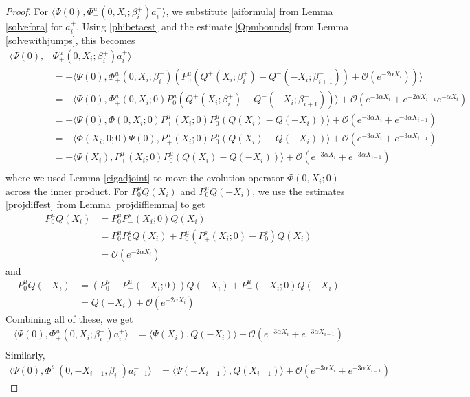 \documentclass[thesis.tex]{subfiles}
\begin{document}
\begin{lemma}
\begin{proof}
For $\langle \Psi(0), \Phi^u_+(0, X_i; \beta_i^+) a_i^+ \rangle$, we substitute \eqref{aiformula} from Lemma \ref{solvefora} for $a_i^+$. Using \eqref{phibetaest} and the estimate \eqref{Qpmbounds} from Lemma \ref{solvewithjumps}, this becomes
\begin{align*}
\langle \Psi(0), &\Phi^u_+(0, X_i; \beta_i^+) a_i^+ \rangle \\
&= -\langle \Psi(0), \Phi^u_+(0, X_i; \beta_i^+)\left( P^u_0 ( Q^+(X_i; \beta_i^+) - Q^-(-X_i; \beta_{i+1}^-)) + \mathcal{O}( e^{-2 \alpha X_i} ) \right) \rangle \\
&= -\langle \Psi(0), \Phi^u_+(0, X_i; 0) P^u_0 \left( Q^+(X_i; \beta_i^+) - Q^-(-X_i; \beta_{i+1}^-) \right) \rangle + \mathcal{O}( e^{-3 \alpha X_i} + e^{-2\alpha X_{i-1}}e^{-\alpha X_i} )\\
&= -\langle \Psi(0), \Phi(0, X_i; 0) P^u_+(X_i; 0) P^u_0 \left( Q(X_i) - Q(-X_i) \right) \rangle + \mathcal{O}( e^{-3 \alpha X_i} + e^{-3\alpha X_{i-1}})\\
&= -\langle \Phi(X_i, 0; 0) \Psi(0), P^u_+(X_i; 0) P^u_0 \left( Q(X_i) - Q(-X_i) \right) \rangle + \mathcal{O}( e^{-3 \alpha X_i} + e^{-3\alpha X_{i-1}})\\
&= -\langle \Psi(X_i), P^u_+(X_i; 0) P^u_0 \left( Q(X_i) - Q(-X_i) \right) \rangle + \mathcal{O}( e^{-3 \alpha X_i} + e^{-3\alpha X_{i-1}})\\
\end{align*}
where we used Lemma \ref{eigadjoint} to move the evolution operator $\Phi(0, X_i; 0)$ across the inner product.
For $P^u_0 Q(X_i)$ and $P^u_0 Q(-X_i)$, we use the estimates \eqref{projdiffest} from Lemma \ref{projdifflemma} to get
\begin{align*}
P^u_0 Q(X_i) &= P^u_0 P^s_+(X_i; 0) Q(X_i) \\
&= P^u_0 P^s_0 Q(X_i) + P^u_0 ( P^s_+(X_i; 0) - P^s_0) Q(X_i) \\
&= \mathcal{O}(e^{-2\alpha X_i})
\end{align*}
and
\begin{align*}
P^u_0 Q(-X_i) &= (P^u_0 - P^u_-(-X_i; 0)) Q(-X_i) + P^u_-(-X_i; 0) Q(-X_i) \\
&= Q(-X_i) + \mathcal{O}(e^{-2\alpha X_i})
\end{align*}
Combining all of these, we get
\begin{align*}
\langle \Psi(0), \Phi^u_+(0, X_i; \beta_i^+) a_i^+ \rangle 
&= \langle \Psi(X_i), Q(-X_i) \rangle + \mathcal{O}( e^{-3 \alpha X_i} + e^{-3\alpha X_{i-1}})\\
\end{align*}
Similarly,
\begin{align*}
\langle \Psi(0), \Phi^s_-(0, -X_{i-1}, \beta_i^-) a_{i-1}^- \rangle &= 
\langle \Psi(-X_{i-1}), Q(X_{i-1}) \rangle + \mathcal{O}( e^{-3 \alpha X_i} + e^{-3\alpha X_{i-1}})
\end{align*}


\end{proof}
\end{lemma}
\end{document}
